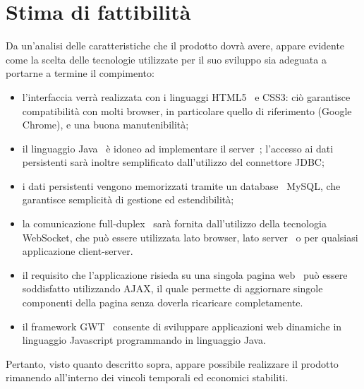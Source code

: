 \section{Stima di fattibilità}

Da un'analisi delle caratteristiche che il prodotto dovrà avere, appare evidente come la scelta delle tecnologie utilizzate per il suo sviluppo sia adeguata a portarne a termine il compimento:
\begin{itemize}
 \item l'interfaccia verrà realizzata con i linguaggi HTML5\g~ e CSS3\g : ciò garantisce compatibilità con molti browser\g , in particolare quello di riferimento (Google Chrome\g ), e una buona manutenibilità;
 \item il linguaggio Java\g~ è idoneo ad implementare il server\g~; l'accesso ai dati persistenti sarà inoltre semplificato dall'utilizzo del connettore JDBC;
 \item i dati persistenti vengono memorizzati tramite un database\g~ MySQL, che garantisce semplicità di gestione ed estendibilità;
 \item la comunicazione full-duplex\g~ sarà fornita dall'utilizzo della tecnologia WebSocket\g , che può essere utilizzata lato browser\g , lato server\g~ o per qualsiasi applicazione client-server\g .
 \item il requisito che l'applicazione risieda su una singola pagina web\g~ può essere soddisfatto utilizzando AJAX\g , il quale permette di aggiornare singole componenti della pagina senza doverla ricaricare completamente.
 \item il framework GWT\g~ consente di sviluppare applicazioni web dinamiche in linguaggio Javascript programmando in linguaggio Java\g .
\end{itemize}

Pertanto, visto quanto descritto sopra, appare possibile realizzare il prodotto rimanendo all'interno dei vincoli temporali ed economici stabiliti.